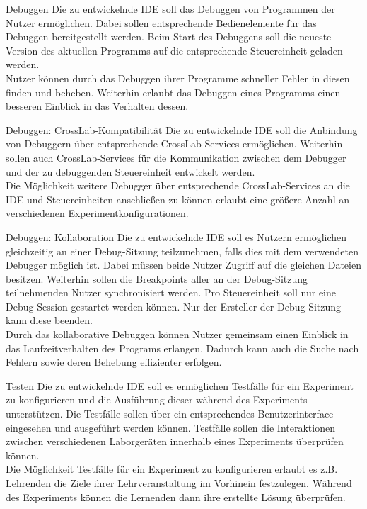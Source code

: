 \begin{requirement}{Debuggen}
    \reqdescription Die zu entwickelnde IDE soll das Debuggen von Programmen der Nutzer ermöglichen. Dabei sollen entsprechende Bedienelemente für das Debuggen bereitgestellt werden. Beim Start des Debuggens soll die neueste Version des aktuellen Programms auf die entsprechende Steuereinheit geladen werden. \\
    \reqrationale Nutzer können durch das Debuggen ihrer Programme schneller Fehler in diesen finden und beheben. Weiterhin erlaubt das Debuggen eines Programms einen besseren Einblick in das Verhalten dessen. \\
\end{requirement}

\begin{requirement}{Debuggen: CrossLab-Kompatibilität}
    \reqdescription Die zu entwickelnde IDE soll die Anbindung von Debuggern über entsprechende CrossLab-Services ermöglichen. Weiterhin sollen auch CrossLab-Services für die Kommunikation zwischen dem Debugger und der zu debuggenden Steuereinheit entwickelt werden. \\
    \reqrationale Die Möglichkeit weitere Debugger über entsprechende CrossLab-Services an die IDE und Steuereinheiten anschließen zu können erlaubt eine größere Anzahl an verschiedenen Experimentkonfigurationen. \\
\end{requirement}

\begin{requirement}{Debuggen: Kollaboration}
    \reqdescription Die zu entwickelnde IDE soll es Nutzern ermöglichen gleichzeitig an einer Debug-Sitzung teilzunehmen, falls dies mit dem verwendeten Debugger möglich ist. Dabei müssen beide Nutzer Zugriff auf die gleichen Dateien besitzen. Weiterhin sollen die Breakpoints aller an der Debug-Sitzung teilnehmenden Nutzer synchronisiert werden. Pro Steuereinheit soll nur eine Debug-Session gestartet werden können. Nur der Ersteller der Debug-Sitzung kann diese beenden. \\
    \reqrationale Durch das kollaborative Debuggen können Nutzer gemeinsam einen Einblick in das Laufzeitverhalten des Programs erlangen. Dadurch kann auch die Suche nach Fehlern sowie deren Behebung effizienter erfolgen. \\
\end{requirement}

\begin{requirement}{Testen}
    \reqdescription Die zu entwickelnde IDE soll es ermöglichen Testfälle für ein Experiment zu konfigurieren und die Ausführung dieser während des Experiments unterstützen. Die Testfälle sollen über ein entsprechendes Benutzerinterface eingesehen und ausgeführt werden können. Testfälle sollen die Interaktionen zwischen verschiedenen Laborgeräten innerhalb eines Experiments überprüfen können. \\
    \reqrationale Die Möglichkeit Testfälle für ein Experiment zu konfigurieren erlaubt es z.B. Lehrenden die Ziele ihrer Lehrveranstaltung im Vorhinein festzulegen. Während des Experiments können die Lernenden dann ihre erstellte Lösung überprüfen. \\
\end{requirement}

